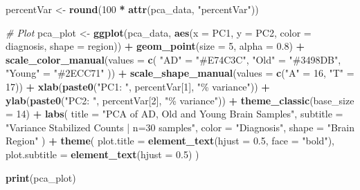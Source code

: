 \documentclass[
]{article}
\newenvironment{Shaded}{\begin{snugshade}}{\end{snugshade}}
\newcommand{\AttributeTok}[1]{\textcolor[rgb]{0.13,0.29,0.53}{#1}}
\newcommand{\CommentTok}[1]{\textcolor[rgb]{0.56,0.35,0.01}{\textit{#1}}}
\newcommand{\DecValTok}[1]{\textcolor[rgb]{0.00,0.00,0.81}{#1}}
\newcommand{\FloatTok}[1]{\textcolor[rgb]{0.00,0.00,0.81}{#1}}
\newcommand{\FunctionTok}[1]{\textcolor[rgb]{0.13,0.29,0.53}{\textbf{#1}}}
\newcommand{\NormalTok}[1]{#1}
\newcommand{\OtherTok}[1]{\textcolor[rgb]{0.56,0.35,0.01}{#1}}
\newcommand{\SpecialCharTok}[1]{\textcolor[rgb]{0.81,0.36,0.00}{\textbf{#1}}}
\newcommand{\StringTok}[1]{\textcolor[rgb]{0.31,0.60,0.02}{#1}}
\begin{document}
\begin{Shaded}
\begin{Highlighting}[]
\NormalTok{percentVar }\OtherTok{\textless{}{-}} \FunctionTok{round}\NormalTok{(}\DecValTok{100} \SpecialCharTok{*} \FunctionTok{attr}\NormalTok{(pca\_data, }\StringTok{"percentVar"}\NormalTok{))}

\CommentTok{\# Plot}
\NormalTok{pca\_plot }\OtherTok{\textless{}{-}} \FunctionTok{ggplot}\NormalTok{(pca\_data, }\FunctionTok{aes}\NormalTok{(}\AttributeTok{x =}\NormalTok{ PC1, }\AttributeTok{y =}\NormalTok{ PC2,}
                                  \AttributeTok{color =}\NormalTok{ diagnosis,}
                                  \AttributeTok{shape =}\NormalTok{ region)) }\SpecialCharTok{+}
    \FunctionTok{geom\_point}\NormalTok{(}\AttributeTok{size =} \DecValTok{5}\NormalTok{, }\AttributeTok{alpha =} \FloatTok{0.8}\NormalTok{) }\SpecialCharTok{+}
    \FunctionTok{scale\_color\_manual}\NormalTok{(}\AttributeTok{values =} \FunctionTok{c}\NormalTok{(}
        \StringTok{"AD"}    \OtherTok{=} \StringTok{"\#E74C3C"}\NormalTok{,}
        \StringTok{"Old"}   \OtherTok{=} \StringTok{"\#3498DB"}\NormalTok{,}
        \StringTok{"Young"} \OtherTok{=} \StringTok{"\#2ECC71"}
\NormalTok{    )) }\SpecialCharTok{+}
    \FunctionTok{scale\_shape\_manual}\NormalTok{(}\AttributeTok{values =} \FunctionTok{c}\NormalTok{(}\StringTok{"A"} \OtherTok{=} \DecValTok{16}\NormalTok{, }\StringTok{"T"} \OtherTok{=} \DecValTok{17}\NormalTok{)) }\SpecialCharTok{+}
    \FunctionTok{xlab}\NormalTok{(}\FunctionTok{paste0}\NormalTok{(}\StringTok{"PC1: "}\NormalTok{, percentVar[}\DecValTok{1}\NormalTok{], }\StringTok{"\% variance"}\NormalTok{)) }\SpecialCharTok{+}
    \FunctionTok{ylab}\NormalTok{(}\FunctionTok{paste0}\NormalTok{(}\StringTok{"PC2: "}\NormalTok{, percentVar[}\DecValTok{2}\NormalTok{], }\StringTok{"\% variance"}\NormalTok{)) }\SpecialCharTok{+}
    \FunctionTok{theme\_classic}\NormalTok{(}\AttributeTok{base\_size =} \DecValTok{14}\NormalTok{) }\SpecialCharTok{+}
    \FunctionTok{labs}\NormalTok{(}
        \AttributeTok{title =} \StringTok{"PCA of AD, Old and Young Brain Samples"}\NormalTok{,}
        \AttributeTok{subtitle =} \StringTok{"Variance Stabilized Counts | n=30 samples"}\NormalTok{,}
        \AttributeTok{color =} \StringTok{"Diagnosis"}\NormalTok{,}
        \AttributeTok{shape =} \StringTok{"Brain Region"}
\NormalTok{    ) }\SpecialCharTok{+}
    \FunctionTok{theme}\NormalTok{(}
        \AttributeTok{plot.title =} \FunctionTok{element\_text}\NormalTok{(}\AttributeTok{hjust =} \FloatTok{0.5}\NormalTok{, }\AttributeTok{face =} \StringTok{"bold"}\NormalTok{),}
        \AttributeTok{plot.subtitle =} \FunctionTok{element\_text}\NormalTok{(}\AttributeTok{hjust =} \FloatTok{0.5}\NormalTok{)}
\NormalTok{    )}

\FunctionTok{print}\NormalTok{(pca\_plot)}
\end{Highlighting}
\end{Shaded}
\end{document}
